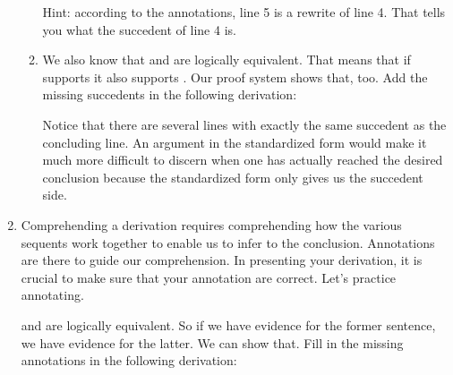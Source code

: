 \begin{enumerate}
\begin{enumerate}
\begin{argument*}





\end{argument*}


   
   Hint: according to the annotations, line 5 is a rewrite of line 4. That tells 
   you what the succedent of line 4 is.


\item We also know that  and  are logically equivalent.  
 That means that if \p{\Gamma} supports  it also supports    
 . Our proof system shows that, too.  Add the missing succedents in 
 the following derivation:
 \begin{argument*}







 \end{argument*}


 Notice that there are several lines with exactly the same succedent as the 
 concluding line. An argument in the standardized form would make it much more 
 difficult to discern when one has actually reached the desired conclusion 
 because the standardized form only gives us the succedent side.
\end{enumerate}

\item Comprehending a derivation requires comprehending how the various sequents 
 work together to enable us to infer to the conclusion. Annotations are there to 
 guide our comprehension. In presenting your derivation, it is crucial to make 
 sure that your annotation are correct. Let's practice annotating.

  and  are logically 
 equivalent. So if we have evidence for the former sentence, we have evidence 
 for the latter. We can show that.  Fill in the missing annotations in the 
 following derivation:


\end{enumerate}
